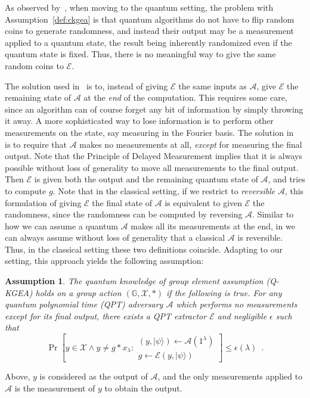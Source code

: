 \documentclass{article}\usepackage[a4paper,margin=20mm]{geometry}
\newtheorem{assumption}[theorem]{Assumption}
\numberwithin{theorem}{section}
\numberwithin{equation}{section}
\newcommand{\G}{\mathbb{G}}
\newcommand{\As}{{\mathcal{A}}}
\newcommand{\Es}{{\mathcal{E}}}
\newcommand{\Xs}{{\mathcal{X}}}
\begin{document}
As observed by~\cite{EC:LiuMonZha23}, when moving to the quantum setting, the problem with Assumption~\ref{def:ckgea} is that quantum algorithms do not have to flip random coins to generate randomness, and instead their output may be a measurement applied to a quantum state, the result being inherently randomized even if the quantum state is fixed. Thus, there is no meaningful way to give the same random coins to $\Es$.

The solution used in~\cite{EC:LiuMonZha23} is to, instead of giving $\Es$ the same inputs as $\As$, give $\Es$ the remaining state of $\As$ at the \emph{end} of the computation. This requires some care, since an algorithm can of course forget any bit of information by simply throwing it away. A more sophisticated way to lose information is to perform other measurements on the state, say measuring in the Fourier basis. The solution in~\cite{EC:LiuMonZha23} is to require that $\As$ makes no measurements at all, \emph{except} for measuring the final output. Note that the Principle of Delayed Measurement implies that it is always possible without loss of generality to move all measurements to the final output. Then $\Es$ is given both the output and the remaining quantum state of $\As$, and tries to compute $g$. Note that in the classical setting, if we restrict to \emph{reversible} $\As$, this formulation of giving $\Es$ the final state of $\As$ is equivalent to given $\Es$ the randomness, since the randomness can be computed by reversing $\As$. Similar to how we can assume a quantum $\As$ makes all its measurements at the end, in we can always assume without loss of generality that a classical $\As$ is reversible. Thus, in the classical setting these two definitions coincide. Adapting to our setting, this approach yields the following assumption:

\begin{assumption}\label{def:qkgea} The \emph{quantum knowledge of group element assumption} (Q-KGEA) holds on a group action $(\G,\Xs,*)$ if the following is true. For any quantum polynomial time (QPT) adversary $\As$ which performs no measurements except for its final output, there exists a QPT extractor $\Es$ and negligible $\epsilon$ such that 
	\[\Pr\left[y\in\Xs\wedge y\neq g*x_\lambda:\substack{(y,|\psi\rangle)\gets\As(1^\lambda)\\g\gets\Es(y,|\psi\rangle)}\right]\leq\epsilon(\lambda)\enspace .\]
\end{assumption}
Above, $y$ is considered as the output of $\As$, and the only measurements applied to $\As$ is the measurement of $y$ to obtain the output.
\end{document}
